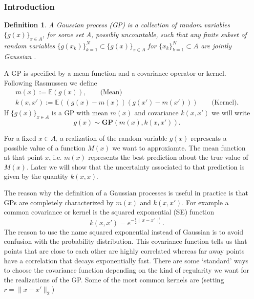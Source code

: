 \documentclass{article}
\newtheorem{definition}{Definition}
\newcommand{\E}{\mathbb{E}}
\begin{document}
\subsubsection*{Introduction}
\begin{definition}\label{dfnGP}
A Gaussian process (GP) is a collection of random variables $\{g(x)\}_{x\in A}$, for some set $A$, 
possibly uncountable,
 such that any finite subset of random variables
 $\{g(x_{k})\}_{k=1}^{N}\subset\{g(x)\}_{x\in A}$ for 
$\{x_{k}\}_{k=1}^{N}\subset A$ are jointly Gaussian
\cite{rasmussen2006gaussian}. 
\end{definition}

A GP is specified by a mean function and a covariance operator or kernel. 
Following  Rasmussen \cite{rasmussen2006gaussian} we define
\begin{eqnarray*}
m(x):=\E(g(x)),\qquad\text{(Mean)}\\
k(x,x'):=\E((g(x)-m(x))(g(x')-m(x')))\qquad\text{(Kernel)}.
\end{eqnarray*}
If $\{g(x)\}_{x\in A}$ is a GP with mean $m(x)$ and covariance $k(x,x')$ we will write
\begin{equation*}
g(x)\sim \textbf{GP}(m(x),k(x,x')).
\end{equation*} 

For a fixed $x\in A$, a realization of the  random variable $g(x)$ represents
a possible value of a function $M(x)$ we want to approxiamte. 
The mean function at that point $x$, i.e. $m(x)$ 
represents the best prediction about the true value of $M(x)$. Later we will show that the uncertainty 
associated to that prediction is given by the quantity $k(x,x)$.
\newline

The reason why the definition of a  Gaussian processes is useful in practice is that  GPs are 
completely characterized by $m(x)$ and $k(x,x')$\cite{lifshits2012lectures}. 
 For example a  common covariance or kernel is the
 squared exponential (SE) function
\begin{equation}\label{eqnsquareexponential}
k(x,x')=e^{-\frac{1}{2}\|x-x'\|_{2}^{2}}.
\end{equation}
The reason to use the name squared exponential instead of Gaussian is to avoid confusion with
the probability distribution.
This  covariance function tells us that points that are close to each other
are highly correlated whereas far away points have a correlation that decays exponentially fast.
There are some `standard' ways to choose the covariance function depending on the kind
of regularity we want for the realizations of the GP.
Some of the most common kernels are \cite{rasmussen2006gaussian} (setting $r=\|x-x'\|_{2}$)
\end{document}
